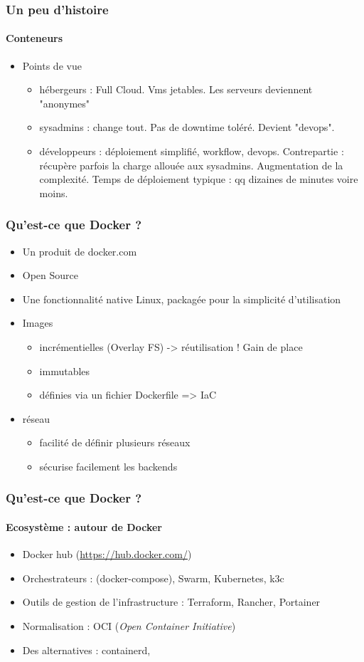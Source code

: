 \documentclass[11pt]{beamer}
\begin{document}
\begin{frame}
\frametitle{Un peu d'histoire}
\framesubtitle{Conteneurs}
\begin{itemize}
	\item[] Points de vue
	\begin{itemize}
		\item hébergeurs : Full Cloud. Vms jetables. Les serveurs deviennent "anonymes"
		\item sysadmins : change tout. Pas de downtime toléré. Devient "devops". 
		\item développeurs : déploiement simplifié, workflow, devops. Contrepartie : récupère parfois la charge allouée aux sysadmins. Augmentation de la complexité. Temps de déploiement typique : qq dizaines de minutes voire moins.
	\end{itemize}
\end{itemize}
\end{frame}

\begin{frame}
\frametitle{Qu'est-ce que Docker ?}
\begin{itemize}
	\item Un produit de docker.com
	\item Open Source
	\item Une fonctionnalité native Linux, packagée pour la simplicité d'utilisation
	\item Images 
	\begin{itemize}
		\item incrémentielles (Overlay FS) -> réutilisation ! Gain de place
		\item immutables
		\item définies via un fichier Dockerfile => IaC
	\end{itemize}
	\item réseau
	\begin{itemize}
		\item facilité de définir plusieurs réseaux
		\item sécurise facilement les backends
	\end{itemize}
\end{itemize}
\end{frame}

\begin{frame}
\frametitle{Qu'est-ce que Docker ?}
\framesubtitle{Ecosystème : autour de Docker}
\begin{itemize}
	\item Docker hub (\url{https://hub.docker.com/})
	\item Orchestrateurs : (docker-compose), Swarm, Kubernetes, k3c
	\item Outils de gestion de l'infrastructure : Terraform, Rancher, Portainer
	\item Normalisation : OCI (\textit{Open Container Initiative})
	\item Des alternatives : containerd, 
\end{itemize}
\end{frame}
\end{document}
